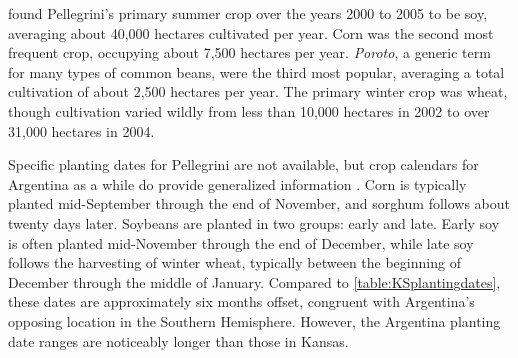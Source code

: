 \textcite{volante2005analisis} found Pellegrini's primary summer crop over the years 2000 to 2005 to be soy, averaging about 40,000 hectares cultivated per year. Corn was the second most frequent crop, occupying about 7,500 hectares per year. \textit{Poroto}, a generic term for many types of common beans, were the third most popular, averaging a total cultivation of about 2,500 hectares per year. The primary winter crop was wheat, though cultivation varied wildly from less than 10,000 hectares in 2002 to over 31,000 hectares in 2004.

Specific planting dates for Pellegrini are not available, but crop calendars for Argentina as a while do provide generalized information \autocites{agriculture-for2008foreign}{sacks2010crop}{soybean-and-cor2013argentina}. Corn is typically planted mid-September through the end of November, and sorghum follows about twenty days later. Soybeans are planted in two groups: early and late. Early soy is often planted mid-November through the end of December, while late soy follows the harvesting of winter wheat, typically between the beginning of December through the middle of January. Compared to \autoref{table:KSplantingdates}, these dates are approximately six months offset, congruent with Argentina's opposing location in the Southern Hemisphere. However, the Argentina planting date ranges are noticeably longer than those in Kansas.

